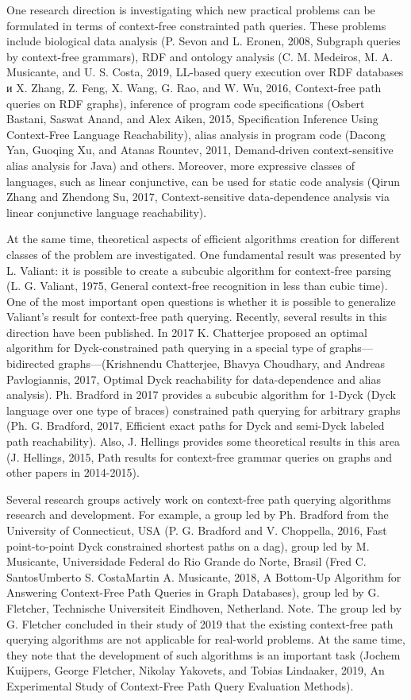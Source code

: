 \documentclass[12pt]{article}  %
\theoremstyle{remark}
\begin{document}
One research direction is investigating which new practical problems can be formulated in terms of context-free constrainted path queries.
These problems include biological data analysis (P. Sevon and L. Eronen, 2008, Subgraph queries by context-free grammars), RDF and ontology analysis (C. M. Medeiros, M. A. Musicante, and U. S. Costa, 2019, LL-based query execution over RDF databases и X. Zhang, Z. Feng, X. Wang, G. Rao, and W. Wu, 2016, Context-free path queries on RDF graphs), inference of program code specifications (Osbert Bastani, Saswat Anand, and Alex Aiken, 2015, Specification Inference Using Context-Free Language Reachability), alias analysis in program code (Dacong Yan, Guoqing Xu, and Atanas Rountev, 2011, Demand-driven context-sensitive alias analysis for Java) and others. 
Moreover, more expressive classes of languages, such as linear conjunctive, can be used for static code analysis (Qirun Zhang and Zhendong Su, 2017, Context-sensitive data-dependence analysis via linear conjunctive language reachability).

At the same time, theoretical aspects of efficient algorithms creation for different classes of the problem are investigated. 
One fundamental result was presented by L. Valiant: it is possible to create a subcubic algorithm for context-free parsing (L. G. Valiant, 1975, General context-free recognition in less than cubic time). 
One of the most important open questions is whether it is possible to generalize Valiant's result for context-free path querying. 
Recently, several results in this direction have been published. 
In 2017 K. Chatterjee proposed an optimal algorithm for Dyck-constrained path querying in a special type of graphs---bidirected graphs---(Krishnendu Chatterjee, Bhavya Choudhary, and Andreas Pavlogiannis, 2017, Optimal Dyck reachability for data-dependence and alias analysis). 
Ph. Bradford in 2017 provides a subcubic algorithm for 1-Dyck (Dyck language over one type of braces) constrained path querying for arbitrary graphs (Ph. G. Bradford, 2017, Efficient exact paths for Dyck and semi-Dyck labeled path reachability). 
Also, J. Hellings provides some theoretical results in this area (J. Hellings, 2015, Path results for context-free grammar queries on graphs and other papers in 2014-2015).

Several research groups actively work on context-free path querying algorithms research and development.
For example, a group led by Ph. Bradford from the University of Connecticut, USA (P. G. Bradford and V. Choppella, 2016, Fast point-to-point Dyck constrained shortest paths on a dag), group led by M. Musicante, Universidade Federal do Rio Grande do Norte, Brasil (Fred C. SantosUmberto S. CostaMartin A. Musicante, 2018, A Bottom-Up Algorithm for Answering Context-Free Path Queries in Graph Databases), group led by G. Fletcher, Technische Universiteit Eindhoven, Netherland. 
Note. The group led by G. Fletcher concluded in their study of 2019 that the existing context-free path querying algorithms are not applicable for real-world problems.
At the same time, they note that the development of such algorithms is an important task (Jochem Kuijpers, George Fletcher, Nikolay Yakovets, and Tobias Lindaaker, 2019, An Experimental Study of Context-Free Path Query Evaluation Methods).
\end{document}
